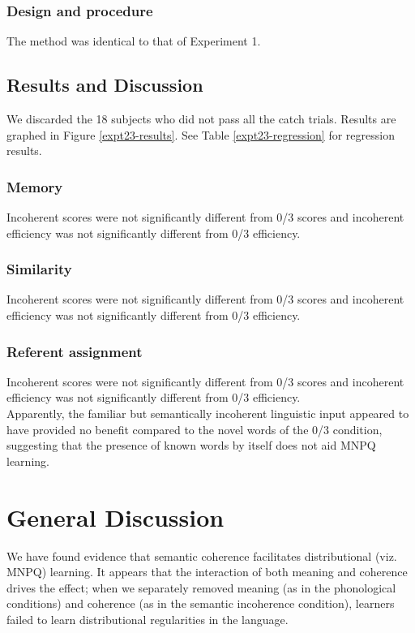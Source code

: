 \documentclass[man,floatsintext]{apa6}
\begin{document}
\subsubsection{Design and procedure}  The method was identical to that of Experiment 1.

\subsection{Results and Discussion}
We discarded the 18 subjects who did not pass all the catch trials. Results are graphed in Figure \ref{expt23-results}. See Table \ref{expt23-regression} for regression results.

\subsubsection{Memory}
Incoherent scores were not significantly different from 0/3 scores and incoherent efficiency was not significantly different from 0/3 efficiency.

\subsubsection{Similarity}
Incoherent scores were not significantly different from 0/3 scores and incoherent efficiency was not significantly different from 0/3 efficiency.

\subsubsection{Referent assignment}
Incoherent scores were not significantly different from 0/3 scores and incoherent efficiency was not significantly different from 0/3 efficiency.\\

Apparently, the familiar but semantically incoherent linguistic input appeared to have provided no benefit compared to the novel words of the 0/3 condition, suggesting that the presence of known words by itself does not aid MNPQ learning.

\section{General Discussion}

We have found evidence that semantic coherence facilitates distributional (viz. MNPQ) learning. It appears that the interaction of both meaning and coherence drives the effect; when we separately removed meaning (as in the phonological conditions) and coherence (as in the semantic incoherence condition), learners failed to learn distributional regularities in the language.
\end{document}
